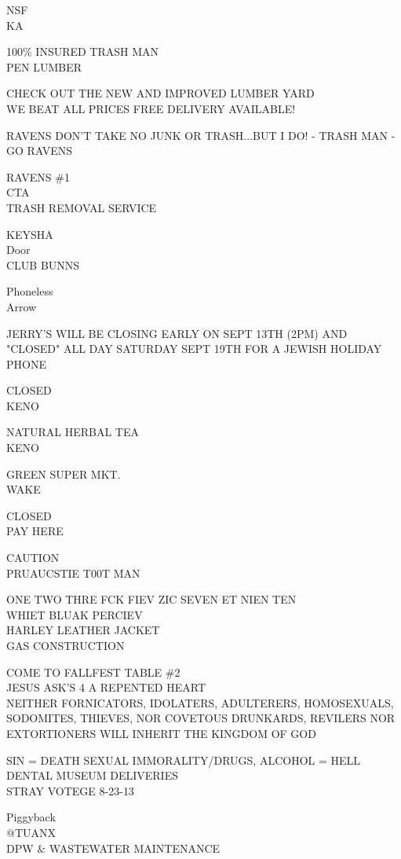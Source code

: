 \documentclass[10pt,letterpaper]{article}
\begin{document}
NSF\\
KA

100\% INSURED TRASH MAN\\
PEN LUMBER

CHECK OUT THE NEW AND IMPROVED LUMBER YARD\\
WE BEAT ALL PRICES FREE DELIVERY AVAILABLE!

RAVENS DON'T TAKE NO JUNK OR TRASH...BUT I DO!  {-} TRASH MAN {-}\\
GO RAVENS

RAVENS \#1\\
CTA\\
TRASH REMOVAL SERVICE

KEYSHA\\
Door\\
CLUB BUNNS

Phoneless\\
Arrow

JERRY'S WILL BE CLOSING EARLY ON SEPT 13TH (2PM) AND "CLOSED" ALL DAY SATURDAY SEPT 19TH FOR A JEWISH HOLIDAY\\
PHONE

CLOSED\\
KENO

NATURAL HERBAL TEA\\
KENO

GREEN SUPER MKT.\\
WAKE

CLOSED\\
PAY HERE

CAUTION\\
PRUAUCSTIE T00T MAN

ONE TWO THRE FCK FIEV ZIC SEVEN ET NIEN TEN\\
WHIET BLUAK PERCIEV\\
HARLEY LEATHER JACKET\\
GAS CONSTRUCTION

COME TO FALLFEST TABLE \#2\\
JESUS ASK'S 4 A REPENTED HEART\\
NEITHER FORNICATORS, IDOLATERS, ADULTERERS, HOMOSEXUALS, SODOMITES, THIEVES, NOR COVETOUS DRUNKARDS, REVILERS NOR EXTORTIONERS WILL INHERIT THE KINGDOM OF GOD

SIN = DEATH SEXUAL IMMORALITY/DRUGS, ALCOHOL = HELL\\
DENTAL MUSEUM DELIVERIES\\
STRAY VOTEGE 8{-}23{-}13

Piggyback\\
@TUANX\\
DPW \& WASTEWATER MAINTENANCE
\end{document}
